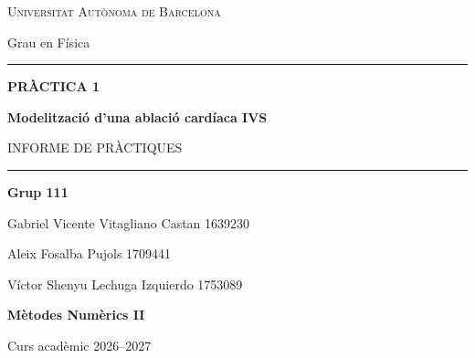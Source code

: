 \documentclass[a4paper,11pt,oneside]{article}
\begin{document}
\begin{titlepage}
    \thispagestyle{empty}
    \centering

    \vspace*{1.5cm}

    {\Large\scshape Universitat Autònoma de Barcelona\par}
    \vspace{0.3cm}
    {\large Grau en Física\par}

    \vspace{2.5cm}

    {\color{gray}\rule{1\textwidth}{1.2pt}\par}

    \vspace{0.8cm}

    {\large\bfseries PRÀCTICA 1\par}

    \vspace{0.5cm}

    {\Huge\bfseries Modelització d'una ablació cardíaca IVS\par}

    \vspace{0.6cm}

    {\large INFORME DE PRÀCTIQUES\par}

    \vspace{0.8cm}

    {\color{gray}\rule{1\textwidth}{1.2pt}\par}

    \vspace{2cm}

    {\large\bfseries Grup 111\par}

    \vspace{0.8cm}

    {\large Gabriel Vicente Vitagliano Castan 1639230\par}
    \vspace{0.2cm}
    {\large Aleix Fosalba Pujols 1709441\par}
    \vspace{0.2cm}
    {\large Víctor Shenyu Lechuga Izquierdo 1753089\par}
    \vspace{0.2cm}
    

    \vfill

    {\large\bfseries Mètodes Numèrics II\par}

    \vspace{0.3cm}

    {\large Curs acadèmic 2026--2027\par}

    \vspace{1cm}

\end{titlepage}
\end{document}
